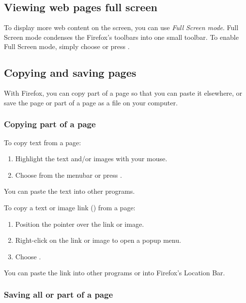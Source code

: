 \subsection{Viewing web pages full screen}

To display more web content on the screen, you can use \emph{Full
Screen mode}. Full Screen mode condenses the Firefox's toolbars into one
small toolbar. To enable Full Screen mode, simply choose  or press .

\subsection{Copying and saving pages}

With Firefox, you can copy part of a page so that you can paste it elsewhere,
or save the page or part of a page as a file on your computer.

\subsubsection{Copying part of a page}

To copy text from a page:

\begin{enumerate}
  \item Highlight the text and/or images with your mouse.
  \item Choose  from the menubar or press . 
\end{enumerate}

\noindent You can paste the text into other programs.

\noindent To copy a text or image link () from a page:

\begin{enumerate}
  \item Position the pointer over the link or image.
  \item Right-click on the link or image to open a popup menu.
  \item Choose .%
\end{enumerate}

\noindent You can paste the link into other programs or into Firefox's Location Bar.

\subsubsection{Saving all or part of a page}

